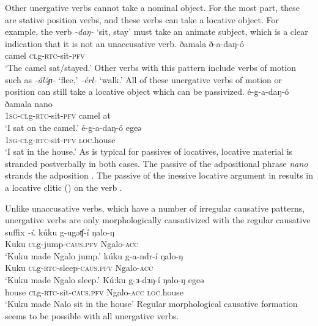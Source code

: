 Other unergative verbs cannot take a nominal object. For the most part, these are stative position verbs, and these verbs can take a locative object. For example, the verb \textit{-daŋ-} `sit, stay' must take an animate subject, which is a clear indication that it is not an unaccusative verb.
\ea 
	\ea	\gll   ðamala ð-a-daŋ-ó \\
		camel \textsc{cl}g-\textsc{rtc}-sit-\textsc{pfv} \\
		\glt `The camel sat/stayed.'
	\z
\z 
Other verbs with this pattern include verbs of motion such as \textit{-álə́ɲ-} `flee,' \textit{-érl-} `walk.'  All of these unergative verbs of motion or position can still take a locative object which can be passivized.
\ea 
	\ea	\gll   é-g-a-daŋ-ó ðamala nano\\
		\textsc{1sg-cl}g-\textsc{rtc}-sit-\textsc{pfv} camel at \\
		\glt `I sat on the camel.'
	 \label{ex:ch12:saton2}
	\z
\ex	\ea	\gll   é-g-a-daŋ-ó egeə\\
		\textsc{1sg-cl}g-\textsc{rtc}-sit-\textsc{pfv} \textsc{loc.}house \\
		\glt `I sat in the house.' \label{ex:ch12:house1}
	 \label{ex:ch12:house2}
	\z
\z  %
As is typical for passives of locatives, locative material is stranded postverbally in both cases. The passive of the adpositional phrase \textit{nano} strands the adposition . The passive of the inessive locative argument in  results in a locative clitic () on the verb .  

Unlike unaccusative verbs, which have a number of irregular causative patterns, unergative verbs are only morphologically causativized with the regular causative suffix \textit{-í}.
\ea	
	\gll	kúku g-ugəʧ-í ŋalo-ŋ\\
			Kuku \textsc{cl}g-jump-\textsc{caus.pfv} Ngalo-\textsc{acc}\\
	\glt 	`Kuku made Ngalo jump.'
\ex	\gll   kúku g-a-ndr-í ŋalo-ŋ\\
		Kuku \textsc{cl}g-\textsc{rtc}-sleep-\textsc{caus.pfv} Ngalo-\textsc{acc}\\
		\glt `Kuku made Ngalo sleep.'
\ex	\gll   Kú:ku  g-ɜ-dɜŋ-í ŋalo-ŋ egeə \\
		house \textsc{cl}g-\textsc{rtc}-sit-\textsc{caus.pfv} Ngalo-\textsc{acc} \textsc{loc.}house\\
		\glt `Kuku made Nalo sit in the house' %
\z
Regular morphological causative formation seems to be possible with all unergative verbs.

